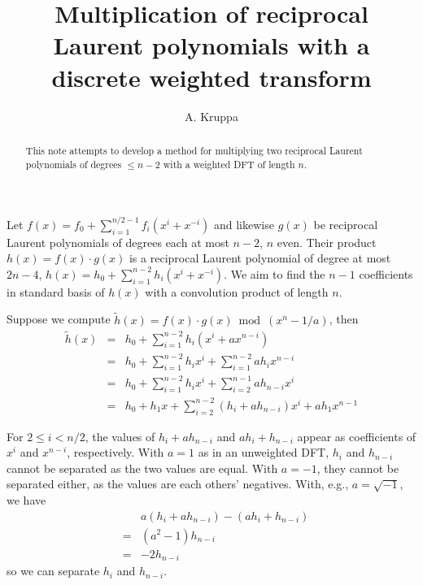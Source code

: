 \documentclass{article}
\begin{document}
\newcommand{\Z}{\mathbb{Z}}
\newcommand{\Zn}[1]{(\Z/{#1}\Z)^{*}}

\title{Multiplication of reciprocal Laurent polynomials with a discrete 
       weighted transform}
\author{A. Kruppa}
\maketitle

\begin{abstract}
This note attempts to develop a method for multiplying two reciprocal
Laurent polynomials of degrees $\leq n - 2$ with a weighted DFT of 
length $n$.
\end{abstract}

Let $f(x) = f_0 + \sum_{i=1}^{n/2-1} f_i (x^i + x^{-i})$ and likewise 
$g(x)$ be reciprocal Laurent polynomials of degrees each at most $n-2$, 
$n$ even.
Their product $h(x) = f(x) \cdot g(x)$ is a reciprocal Laurent polynomial 
of degree at most $2n-4$, 
$h(x) = h_0 + \sum_{i=1}^{n-2} h_i (x^i + x^{-i})$. We aim to find the
$n-1$ coefficients in standard basis of $h(x)$ with a convolution product
of length $n$.

Suppose we compute $\tilde{h}(x) = f(x) \cdot g(x) \bmod (x^n - 1/a)$, then
\begin{eqnarray*}
  \tilde{h}(x) & = & h_0 + \sum_{i=1}^{n-2} h_i (x^i + ax^{n-i}) \\
               & = & h_0 + \sum_{i=1}^{n-2} h_i x^i + \sum_{i=1}^{n-2} ah_i x^{n-i} \\
               & = & h_0 + \sum_{i=1}^{n-2} h_i x^i + \sum_{i=2}^{n-1} ah_{n-i} x^i \\
               & = & h_0 + h_1 x + \sum_{i=2}^{n-2} (h_i + ah_{n-i}) x^i + ah_1 x^{n-1}
\end{eqnarray*}

For $2 \leq i < n/2$, the values of $h_i + ah_{n-i}$ and $ah_i + h_{n-i}$ 
appear as coefficients
of $x^i$ and $x^{n-i}$, respectively. With $a=1$ as in an unweighted DFT,
$h_i$ and $h_{n-i}$ cannot be separated as the two values are equal. With
$a=-1$, they cannot be separated either, as the values are each others'
negatives. With, e.g., $a=\sqrt{-1}$, we have
\begin{eqnarray*}
 &   & a (h_i + ah_{n-i}) - (ah_i + h_{n-i}) \\
 & = & (a^2-1) h_{n-i} \\
 & = & -2 h_{n-i}
\end{eqnarray*}
so we can separate $h_i$ and $h_{n-i}$.
\end{document}
